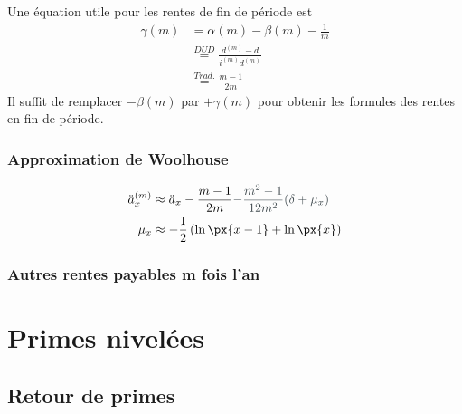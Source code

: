 \documentclass[10pt, french]{article}
\begin{document}
\begin{multicols*}{3}
Une équation utile pour les rentes de fin de période est 
\begin{align*}
	\gamma(m) 
	&=	\alpha(m) - \beta(m) - \frac{1}{m}	\\
	&\overset{DUD}{=} \frac{d^{(m)} - d}{i^{(m)} d^{(m)}}	\\
	&\overset{Trad.}{=} \frac{m - 1}{2m}	
\end{align*}
Il suffit de remplacer $-\beta(m)$ par $+\gamma(m)$ pour obtenir les formules des rentes en fin de période.


\subsubsection*{Approximation de Woolhouse}

\begin{align*}
	\ddot{a}_{x}^{(m)}
	&\approx	\ddot{a}_{x} - \frac{m - 1}{2m} \textcolor{arsenic}{- \frac{m^{2} - 1}{12m^{2}} (\delta + \mu_{x})}	\\
	\mu_{x}
	&\approx		-	\frac{1}{2} \left( \ln \px{x - 1} + \ln \px{x} \right)
\end{align*}


\subsubsection*{\textcolor{amber(sae/ece)}{Autres rentes payables m fois l'an}}


\section{Primes nivelées}

\setcounter{subsection}{5}
\subsection{Retour de primes}


\end{multicols*}
\end{document}
